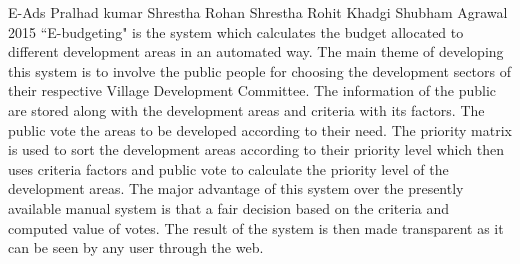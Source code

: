  \begin{conf-abstract}[]
{E-Ads}
{
Pralhad kumar Shrestha
Rohan Shrestha
Rohit Khadgi
Shubham Agrawal
}
{2015}
``E-budgeting" is the system which calculates the budget allocated to different development areas in an automated way. The main theme of developing this system is to involve the public people for choosing the development sectors of their respective Village Development Committee. The information of the public are stored along with the development areas and criteria with its factors. The public vote the areas to be developed according to their need. The priority matrix is used to sort the development areas according to their priority level which then uses criteria factors and public vote to calculate the priority level of the development areas. The major advantage of this system over the presently available manual system is that a fair decision based on the criteria and computed value of votes. The result of the system is then made transparent as it can be seen by any user through the web.
  \end{conf-abstract}